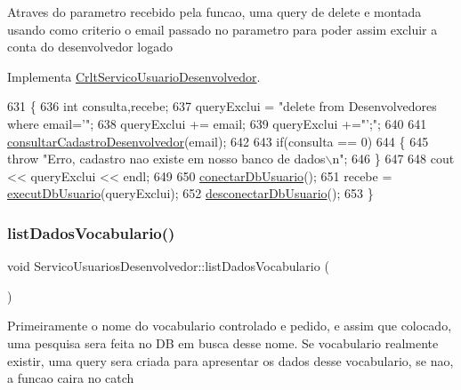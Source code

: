 Atraves do parametro recebido pela funcao, uma query de delete e montada usando como criterio o email passado no parametro para poder assim excluir a conta do desenvolvedor logado

Implementa \mbox{\hyperlink{class_crlt_servico_usuario_desenvolvedor_aa106326b5823377bd842b7448e0b4ee3}{Crlt\+Servico\+Usuario\+Desenvolvedor}}.


\begin{DoxyCode}
631 \{
636   \textcolor{keywordtype}{int} consulta,recebe;
637   queryExclui = \textcolor{stringliteral}{"delete from Desenvolvedores where email='"};
638   queryExclui += email;
639   queryExclui +=\textcolor{stringliteral}{"';"};
640 
641   \mbox{\hyperlink{class_servico_usuarios_desenvolvedor_a552cca1c14e7c9dd87600062d524ffa8}{consultarCadastroDesenvolvedor}}(email);
642 
643   \textcolor{keywordflow}{if}(consulta == 0)
644   \{
645     \textcolor{keywordflow}{throw} \textcolor{stringliteral}{"Erro, cadastro nao existe em nosso banco de dados\(\backslash\)n"};
646   \}
647 
648   cout << queryExclui << endl;
649 
650   \mbox{\hyperlink{comando_sql_8cpp_a4f89ddcbc4cf8f2587d89f72f8c7900d}{conectarDbUsuario}}();
651   recebe = \mbox{\hyperlink{comando_sql_8cpp_a748197580e7f9acdbf48c78de1f7924b}{executDbUsuario}}(queryExclui);
652   \mbox{\hyperlink{comando_sql_8cpp_a969be9911913568e30d4ae8963338bc3}{desconectarDbUsuario}}();
653 \}
\end{DoxyCode}
\mbox{\label{class_servico_usuarios_desenvolvedor_a5748ea9d0e56ffcad31ad486ecb8b79f}} 
\subsubsection{\texorpdfstring{list\+Dados\+Vocabulario()}{listDadosVocabulario()}}
{\footnotesize\ttfamily void Servico\+Usuarios\+Desenvolvedor\+::list\+Dados\+Vocabulario (\begin{DoxyParamCaption}{ }\end{DoxyParamCaption})\hspace{0.3cm}{\ttfamily [virtual]}}

Primeiramente o nome do vocabulario controlado e pedido, e assim que colocado, uma pesquisa sera feita no DB em busca desse nome. Se vocabulario realmente existir, uma query sera criada para apresentar os dados desse vocabulario, se nao, a funcao caira no catch

